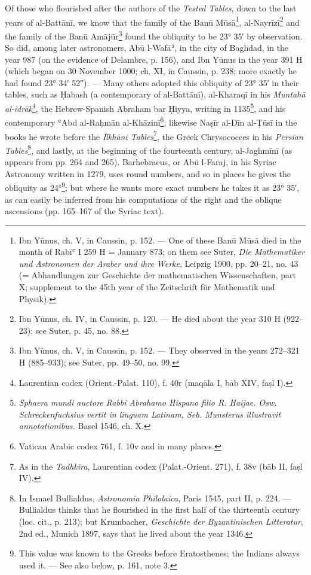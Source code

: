 \documentclass[11pt]{article}
\newcommand{\Pg}[1]{\marginpar{\footnotesize\color{gray}#1}}
\begin{document}
\par \Pg{I 159}Of those who flourished after the authors of the \emph{Tested Tables}, down to the last years of al-Battānī, we know that the family of the Banū Mūsā\footnote{Ibn Yūnus, ch. V, in Caussin, p. 152. — One of these Banū Mūsā died in the month of Rabīʿ I 259 H = January 873; on them see Suter, \emph{Die Mathematiker und Astronomen der Araber und ihre Werke}, Leipzig 1900, pp. 20–21, no. 43 (= Abhandlungen zur Geschichte der mathematischen Wissenschaften, part X; supplement to the 45th year of the Zeitschrift für Mathematik und Physik).}, al-Nayrīzī\footnote{Ibn Yūnus, ch. IV, in Caussin, p. 120. — He died about the year 310 H (922–23); see Suter, p. 45, no. 88.} and the family of the Banū Amājūr\footnote{Ibn Yūnus, ch. V, in Caussin, p. 152. — They observed in the years 272–321 H (885–933); see Suter, pp. 49–50, no. 99.} found the obliquity to be 23° 35′ by observation. So did, among later astronomers, Abū l-Wafāʾ, in the city of Baghdad, in the year 987 (on the evidence of Delambre, p. 156), and Ibn Yūnus in the year 391 H (which began on 30 November 1000; ch. XI, in Caussin, p. 238; more exactly he had found 23° 34′ 52″). — Many others adopted this obliquity of 23° 35′ in their tables, such as Ḥabash (a contemporary of al-Battānī), al-Kharaqī in his \emph{Muntahā al-idrāk}\footnote{Laurentian codex (Orient.-Palat. 110), f. 40r (maqāla I, bāb XIV, faṣl I).}, the Hebrew-Spanish Abraham bar Ḥiyya, writing in 1135\footnote{\emph{Sphaera mundi auctore Rabbi Abrahamo Hispano filio R. Haijae. Osw. Schreckenfuchsius vertit in linguam Latinam, Seb. Munsterus illustravit annotationibus.} Basel 1546, ch. X.}, and his contemporary ʿAbd al-Raḥmān al-Khāzinī\footnote{Vatican Arabic codex 761, f. 10v and in many places.}; likewise Naṣīr al-Dīn al-Ṭūsī in the books he wrote before the \emph{Īlkhānī Tables}\footnote{As in the \emph{Tadhkira}, Laurentian codex (Palat.-Orient. 271), f. 38v (bāb II, faṣl IV).}, the Greek Chrysococces in his \emph{Persian Tables}\footnote{In Ismael Bullialdus, \emph{Astronomia Philolaica}, Paris 1545, part II, p. 224. — Bullialdus thinks that he flourished in the first half of the thirteenth century (loc. cit., p. 213); but Krumbacher, \emph{Geschichte der Byzantinischen Litteratur}, 2nd ed., Munich 1897, says that he lived about the year 1346.}, and lastly, at the beginning of the fourteenth century, al-Jaghmīnī (as appears from pp. 264 and 265). Barhebraeus, or Abū l-Faraj, in his Syriac Astronomy written in 1279, uses round numbers, and so in places he gives the obliquity as 24°\footnote{This value was known to the Greeks before Eratosthenes; the Indians always used it. — See also below, p. 161, note 3.}; but where he wants more exact numbers he takes it as 23° 35′, as can easily be inferred from his computations of the right and the oblique ascensions (pp. 165–167 of the Syriac text).\par
\end{document}
